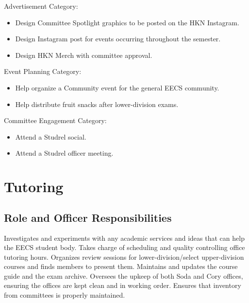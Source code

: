 \documentclass[11pt, article, oneside]{memoir}
\begin{document}
        Advertisement Category:
        \begin{itemize}
            \item Design Committee Spotlight graphics to be posted on the HKN Instagram.
            \item Design Instagram post for events occurring throughout the semester.
            \item Design HKN Merch with committee approval.
        \end{itemize}

        Event Planning Category:
        \begin{itemize}
            \item Help organize a Community event for the general EECS community.
            \item Help distribute fruit snacks after lower-division exams.
        \end{itemize}

        Committee Engagement Category:
        \begin{itemize}
            \item Attend a Studrel social.
            \item Attend a Studrel officer meeting.
        \end{itemize}

    \section{Tutoring}
    \subsection{Role and Officer Responsibilities}
    Investigates and experiments with any academic services and ideas that can help the EECS student body.
    Takes charge of scheduling and quality controlling office tutoring hours.
    Organizes review sessions for lower-division/select upper-division courses and finds members to present them.
    Maintains and updates the course guide and the exam archive.
    Oversees the upkeep of both Soda and Cory offices, ensuring the offices are kept clean and in working order.
    Ensures that inventory from committees is properly maintained.
\end{document}
